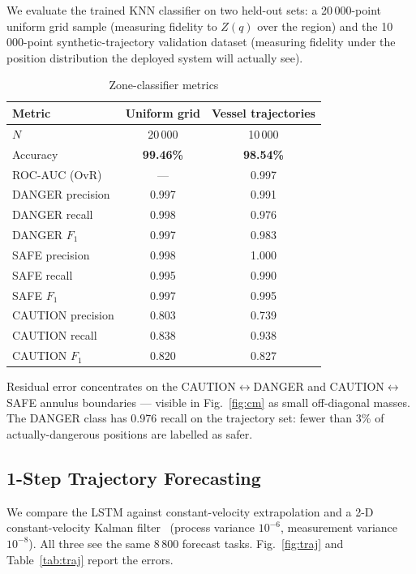 \documentclass[conference]{IEEEtran}
\begin{document}
We evaluate the trained KNN classifier on two held-out sets: a 20\,000-point uniform grid sample (measuring fidelity to $Z(q)$ over the region) and the 10\,000-point synthetic-trajectory validation dataset (measuring fidelity under the position distribution the deployed system will actually see).

\begin{table}[t]
\centering
\caption{Zone-classifier metrics}
\label{tab:zone}
\begin{tabular}{@{}lcc@{}}
\toprule
\textbf{Metric} & \textbf{Uniform grid} & \textbf{Vessel trajectories} \\
\midrule
$N$ & 20\,000 & 10\,000 \\
Accuracy & \textbf{99.46\%} & \textbf{98.54\%} \\
ROC-AUC (OvR) & --- & 0.997 \\
DANGER precision & 0.997 & 0.991 \\
DANGER recall & 0.998 & 0.976 \\
DANGER $F_1$ & 0.997 & 0.983 \\
SAFE precision & 0.998 & 1.000 \\
SAFE recall & 0.995 & 0.990 \\
SAFE $F_1$ & 0.997 & 0.995 \\
CAUTION precision & 0.803 & 0.739 \\
CAUTION recall & 0.838 & 0.938 \\
CAUTION $F_1$ & 0.820 & 0.827 \\
\bottomrule
\end{tabular}
\end{table}

Residual error concentrates on the CAUTION$\leftrightarrow$DANGER and CAUTION$\leftrightarrow$SAFE annulus boundaries --- visible in Fig.~\ref{fig:cm} as small off-diagonal masses. The DANGER class has 0.976 recall on the trajectory set: fewer than 3\% of actually-dangerous positions are labelled as safer.

\subsection{1-Step Trajectory Forecasting}

We compare the LSTM against constant-velocity extrapolation and a 2-D constant-velocity Kalman filter~\cite{kalman1960} (process variance $10^{-6}$, measurement variance $10^{-8}$). All three see the same 8\,800 forecast tasks. Fig.~\ref{fig:traj} and Table~\ref{tab:traj} report the errors.
\end{document}
